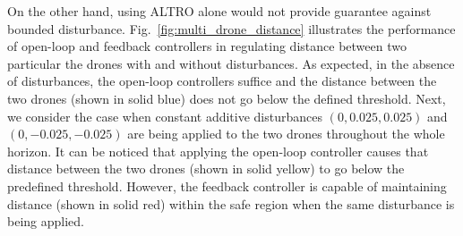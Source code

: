 On the other hand, using ALTRO alone would not provide guarantee against bounded disturbance.  
Fig.~\ref{fig:multi_drone_distance} illustrates the performance of open-loop and feedback controllers in regulating distance between two particular 
the drones with and without disturbances. 
As expected, in the absence of disturbances, the open-loop controllers suffice and the distance between the two drones (shown in solid blue) 
does not go below the defined threshold. 
Next, we consider the case when constant additive disturbances $(0 ,0.025,0.025)$ 
and $(0,-0.025,-0.025)$ are being applied to the two drones throughout the whole horizon. 
It can be noticed that applying the open-loop controller causes that distance between the two drones (shown in solid yellow) to 
go below the predefined threshold. 
However, the feedback controller is capable of maintaining distance (shown in solid red) within the safe region when the same disturbance is being applied.



